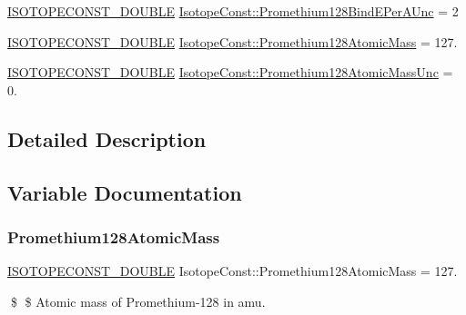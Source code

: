 \begin{DoxyCompactItemize}
\mbox{\hyperlink{group___isotope_const-_macros_ga8f45a7272ce02c0b4c65c44636ed719a}{I\+S\+O\+T\+O\+P\+E\+C\+O\+N\+S\+T\+\_\+\+D\+O\+U\+B\+LE}} \mbox{\hyperlink{group___isotope_const-_promethium-_pm128_ga9c7b4384577f17a6315ab1aa72cb6f0c}{Isotope\+Const\+::\+Promethium128\+Bind\+E\+Per\+A\+Unc}} = 2
\item 
\mbox{\hyperlink{group___isotope_const-_macros_ga8f45a7272ce02c0b4c65c44636ed719a}{I\+S\+O\+T\+O\+P\+E\+C\+O\+N\+S\+T\+\_\+\+D\+O\+U\+B\+LE}} \mbox{\hyperlink{group___isotope_const-_promethium-_pm128_ga53c989f4fce172569650ab03432f838e}{Isotope\+Const\+::\+Promethium128\+Atomic\+Mass}} = 127.
\item 
\mbox{\hyperlink{group___isotope_const-_macros_ga8f45a7272ce02c0b4c65c44636ed719a}{I\+S\+O\+T\+O\+P\+E\+C\+O\+N\+S\+T\+\_\+\+D\+O\+U\+B\+LE}} \mbox{\hyperlink{group___isotope_const-_promethium-_pm128_gad90d8e17fea720331ca1aa37f8ca826f}{Isotope\+Const\+::\+Promethium128\+Atomic\+Mass\+Unc}} = 0.
\end{DoxyCompactItemize}


\subsection{Detailed Description}


\subsection{Variable Documentation}
\mbox{\label{group___isotope_const-_promethium-_pm128_ga53c989f4fce172569650ab03432f838e}} 
\subsubsection{\texorpdfstring{Promethium128\+Atomic\+Mass}{Promethium128AtomicMass}}
{\footnotesize\ttfamily \mbox{\hyperlink{group___isotope_const-_macros_ga8f45a7272ce02c0b4c65c44636ed719a}{I\+S\+O\+T\+O\+P\+E\+C\+O\+N\+S\+T\+\_\+\+D\+O\+U\+B\+LE}} Isotope\+Const\+::\+Promethium128\+Atomic\+Mass = 127.}

\$ \$ Atomic mass of Promethium-\/128 in amu. \mbox{\label{group___isotope_const-_promethium-_pm128_gad90d8e17fea720331ca1aa37f8ca826f}} 
